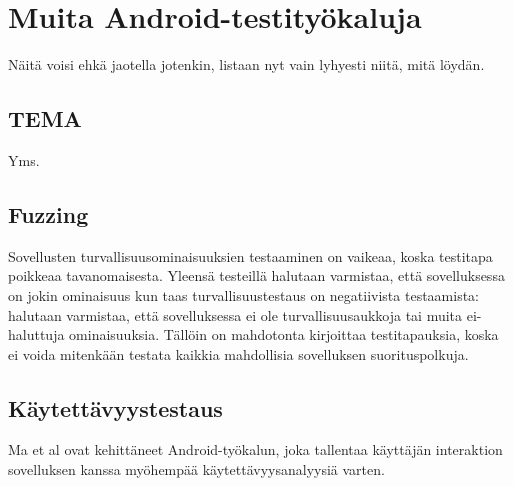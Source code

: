 \section{Muita Android-testityökaluja}

Näitä voisi ehkä jaotella jotenkin, listaan nyt vain lyhyesti niitä, mitä löydän.

\subsection{TEMA}

Yms.

\subsection{Fuzzing}

Sovellusten turvallisuusominaisuuksien testaaminen on vaikeaa, koska testitapa poikkeaa tavanomaisesta. Yleensä testeillä halutaan varmistaa, että sovelluksessa on jokin ominaisuus kun taas turvallisuustestaus on negatiivista testaamista: halutaan varmistaa, että sovelluksessa ei ole turvallisuusaukkoja tai muita ei-haluttuja ominaisuuksia. Tällöin on mahdotonta kirjoittaa testitapauksia, koska ei voida mitenkään testata kaikkia mahdollisia sovelluksen suorituspolkuja.\cite{mahmoodetal12}

\subsection{Käytettävyystestaus}

Ma et al \cite{maetal11} ovat kehittäneet Android-työkalun, joka tallentaa käyttäjän interaktion sovelluksen kanssa myöhempää käytettävyysanalyysiä varten.